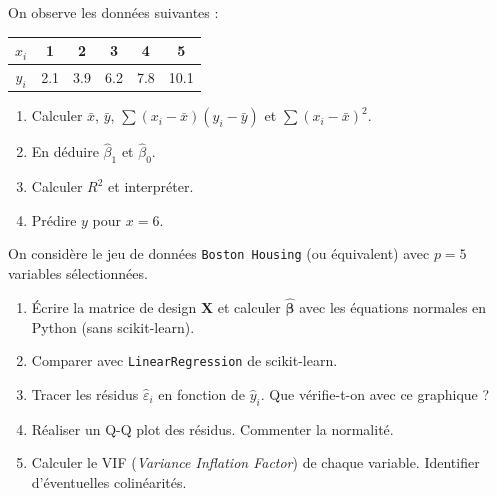 \begin{exercice}
On observe les donn\'ees suivantes :
\begin{center}
\begin{tabular}{c|ccccc}
$x_i$ & 1 & 2 & 3 & 4 & 5 \\
\hline
$y_i$ & 2.1 & 3.9 & 6.2 & 7.8 & 10.1
\end{tabular}
\end{center}
\begin{enumerate}
  \item Calculer $\bar{x}$, $\bar{y}$, $\sum(x_i - \bar{x})(y_i - \bar{y})$
        et $\sum(x_i - \bar{x})^2$.
  \item En d\'eduire $\hat{\beta}_1$ et $\hat{\beta}_0$.
  \item Calculer $R^2$ et interpr\'eter.
  \item Pr\'edire $y$ pour $x = 6$.
\end{enumerate}
\end{exercice}

\begin{exercice}
On consid\`ere le jeu de donn\'ees \texttt{Boston Housing} (ou \'equivalent) avec $p = 5$
variables s\'electionn\'ees.
\begin{enumerate}
  \item \'Ecrire la matrice de design $\bm{X}$ et calculer $\hat{\bm{\beta}}$ avec les
        \'equations normales en Python (sans scikit-learn).
  \item Comparer avec \texttt{LinearRegression} de scikit-learn.
  \item Tracer les r\'esidus $\hat{\varepsilon}_i$ en fonction de $\hat{y}_i$.
        Que v\'erifie-t-on avec ce graphique ?
  \item R\'ealiser un Q-Q plot des r\'esidus. Commenter la normalit\'e.
  \item Calculer le VIF (\emph{Variance Inflation Factor}) de chaque variable.
        Identifier d'\'eventuelles colin\'earit\'es.
\end{enumerate}
\end{exercice}

